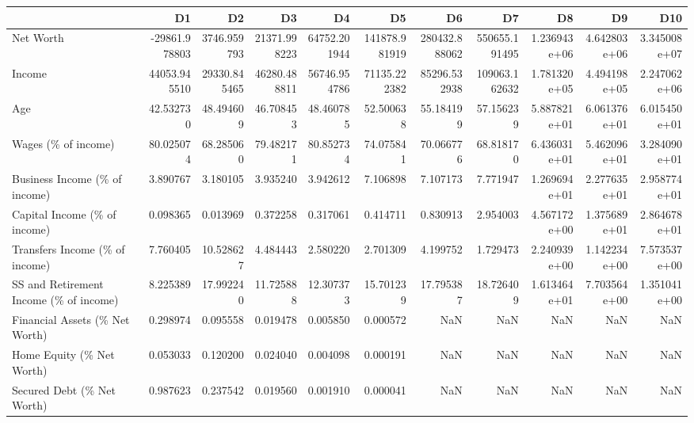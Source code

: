 \begin{tabular}{lrrrrrrrrrr}
\toprule
{} &            D1 &            D2 &            D3 &            D4 &             D5 &             D6 &             D7 &            D8 &            D9 &           D10 \\
\midrule
Net Worth                              & -29861.978803 &   3746.959793 &  21371.998223 &  64752.201944 &  141878.981919 &  280432.888062 &  550655.191495 &  1.236943e+06 &  4.642803e+06 &  3.345008e+07 \\
Income                                 &  44053.945510 &  29330.845465 &  46280.488811 &  56746.954786 &   71135.222382 &   85296.532938 &  109063.162632 &  1.781320e+05 &  4.494198e+05 &  2.247062e+06 \\
Age                                    &     42.532730 &     48.494609 &     46.708453 &     48.460785 &      52.500638 &      55.184199 &      57.156239 &  5.887821e+01 &  6.061376e+01 &  6.015450e+01 \\
Wages (\% of income)                    &     80.025074 &     68.285060 &     79.482171 &     80.852734 &      74.075841 &      70.066776 &      68.818170 &  6.436031e+01 &  5.462096e+01 &  3.284090e+01 \\
Business Income (\% of income)          &      3.890767 &      3.180105 &      3.935240 &      3.942612 &       7.106898 &       7.107173 &       7.771947 &  1.269694e+01 &  2.277635e+01 &  2.958774e+01 \\
Capital Income (\% of income)           &      0.098365 &      0.013969 &      0.372258 &      0.317061 &       0.414711 &       0.830913 &       2.954003 &  4.567172e+00 &  1.375689e+01 &  2.864678e+01 \\
Transfers Income (\% of income)         &      7.760405 &     10.528627 &      4.484443 &      2.580220 &       2.701309 &       4.199752 &       1.729473 &  2.240939e+00 &  1.142234e+00 &  7.573537e+00 \\
SS and Retirement Income (\% of income) &      8.225389 &     17.992240 &     11.725888 &     12.307373 &      15.701239 &      17.795387 &      18.726409 &  1.613464e+01 &  7.703564e+00 &  1.351041e+00 \\
Financial Assets (\% Net Worth)         &      0.298974 &      0.095558 &      0.019478 &      0.005850 &       0.000572 &            NaN &            NaN &           NaN &           NaN &           NaN \\
Home Equity (\% Net Worth)              &      0.053033 &      0.120200 &      0.024040 &      0.004098 &       0.000191 &            NaN &            NaN &           NaN &           NaN &           NaN \\
Secured Debt (\% Net Worth)             &      0.987623 &      0.237542 &      0.019560 &      0.001910 &       0.000041 &            NaN &            NaN &           NaN &           NaN &           NaN \\
\bottomrule
\end{tabular}
